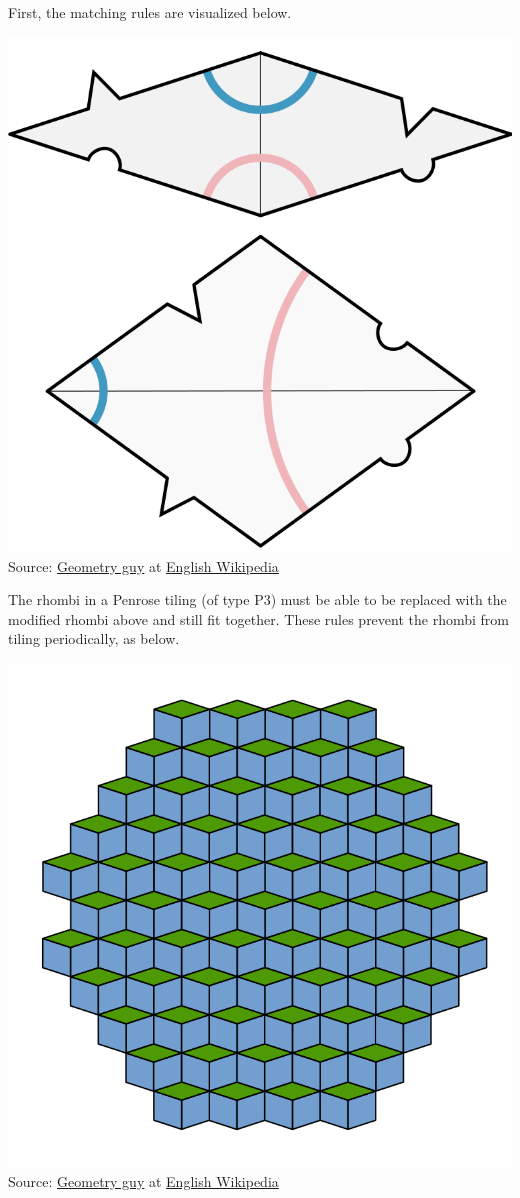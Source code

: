 \documentclass{article}
\begin{document}
First, the matching rules are visualized below.
\begin{center}
  \includegraphics[width=0.25\linewidth]{matching.png}\\
  Source: \href{https://en.wikipedia.org/wiki/User:Geometry_guy}{Geometry guy}
  at \href{https://en.wikipedia.org/wiki/}{English Wikipedia}
\end{center}
The rhombi in a Penrose tiling (of type P3)
must be able to be replaced with the modified rhombi above and still fit together.
These rules prevent the rhombi from tiling periodically, as below.
\begin{center}
  \includegraphics[width=0.25\linewidth]{periodic.png}\\
  Source: \href{https://en.wikipedia.org/wiki/User:Geometry_guy}{Geometry guy}
  at \href{https://en.wikipedia.org/wiki/}{English Wikipedia}
\end{center}
\end{document}
